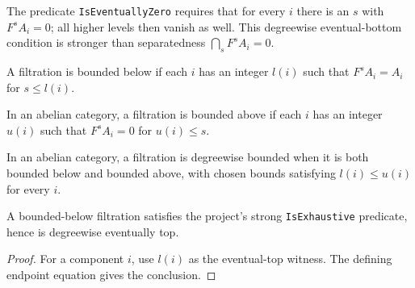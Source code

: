 \begin{definition}
  \leanok
  \label{def:core-eventually-zero-filtration}
  The predicate \texttt{IsEventuallyZero} requires that for every $i$ there
  is an $s$ with $F^sA_i=0$; all higher levels then vanish as well.  This
  degreewise eventual-bottom condition is stronger than separatedness
  $\bigcap_sF^sA_i=0$.
\end{definition}

\begin{definition}
  \leanok
  \label{def:core-bounded-below-filtration}
  A filtration is bounded below if each $i$ has an integer $l(i)$ such
  that $F^sA_i=A_i$ for $s\le l(i)$.
\end{definition}

\begin{definition}
  \leanok
  \label{def:core-bounded-above-filtration}
  In an abelian category, a filtration is bounded above if each $i$ has an
  integer $u(i)$ such that $F^sA_i=0$ for $u(i)\le s$.
\end{definition}

\begin{definition}
  \leanok
  \label{def:core-bounded-filtration}
  In an abelian category, a filtration is degreewise bounded when it is both
  bounded below and bounded above, with chosen bounds satisfying
  $l(i)\le u(i)$ for every $i$.
\end{definition}

\begin{lemma}
  \leanok
  \label{lem:core-bounded-below-exhaustive}
  A bounded-below filtration satisfies the project's strong
  \texttt{IsExhaustive} predicate, hence is degreewise eventually top.
\end{lemma}

\begin{proof}
  \leanok
  For a component $i$, use $l(i)$ as the eventual-top witness.  The
  defining endpoint equation gives the conclusion.
\end{proof}

